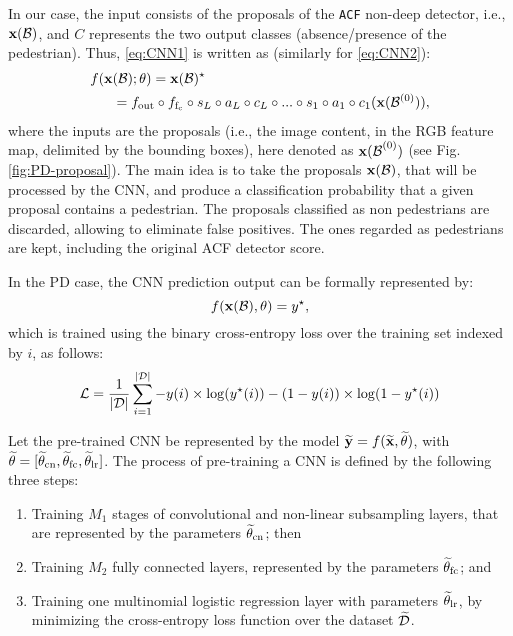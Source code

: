 \documentclass[5p,time]{elsarticle}
\begin{document}
In our case, the input consists of the proposals of the \texttt{ACF} non-deep detector, i.e., ${\bf x}({\cal B})$, and $C$ represents the two output classes
(absence/presence of the pedestrian). Thus, \eqref{eq:CNN1} is written as (similarly for \eqref{eq:CNN2}):
\begin{equation}
\begin{split}
f({\bf x}&({\cal B});\theta) = {\bf x}({\cal B })^{\star}\\
&=f_{\rm out}\circ f_{\rm f_{c}} \circ s_{L} \circ a_L \circ c_L\circ ... \circ s_1 \circ a_1 \circ c_1({\bf x}({\cal B}^{(0)})),
\end{split}
\end{equation}
where the inputs are the proposals (i.e., the image content, in the RGB feature map, delimited by the bounding boxes), here denoted as ${{\bf x}(\cal B}^{(0)})$ (see Fig. \ref{fig:PD-proposal}). The main idea is to take the proposals ${\bf x}({\cal B})$, that will be processed by the CNN, and produce a classification probability that a given proposal contains a pedestrian. The proposals classified as non pedestrians are discarded, allowing to eliminate false positives. The ones regarded as pedestrians are kept, including the original ACF detector score.

In the PD case, the CNN prediction output can be formally represented by:
\begin{equation}
f({\bf x}({\cal B}),\theta)= y^{\star},
\end{equation}
which is trained using the binary cross-entropy loss over the training set indexed by $i$, as follows:
\begin{equation}{\cal L} = \frac{1}{|{\cal D}|}\sum_{i=1}^{|\cal D|} - y(i)\times \log(y^{\star}(i)) - (1-y(i)) \times \log(1-y^{\star}(i))\label{eq:binary-loss}
\end{equation}

Let the pre-trained CNN be represented by the model $\widetilde{\bf y}=f(\widetilde{\bf x},\widetilde{\theta})$, with $\widetilde\theta=[\widetilde\theta_{\rm cn},\widetilde\theta_{\rm fc},\widetilde\theta_{\rm lr}]$. The process of pre-training a CNN  is defined by the following three steps:
\begin{enumerate}
	\item{Training $M_1$ stages of convolutional and non-linear subsampling layers, that are represented by the parameters $\widetilde{\theta}_{\rm cn}$; then} 
	\item{Training $M_2$ fully connected layers, represented by the parameters $\widetilde{\theta}_{\rm fc}$; and} 
	\item{Training one multinomial logistic regression layer with parameters $\widetilde{\theta}_{\rm lr}$, by minimizing the cross-entropy loss function \cite{KrizhevskyNIPS2012} over the dataset $\widetilde{\cal D}$.} 
\end{enumerate}
\end{document}
